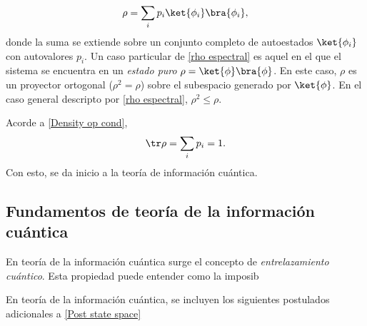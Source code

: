  \begin{equation}
     \rho = \sum_{i} p_i \ket{\phi_i} \bra{\phi_i},
     \label{rho espectral}
 \end{equation}
 donde la suma se extiende sobre un conjunto completo de autoestados $\ket{\phi_i}$ con autovalores $p_i$. Un caso particular de \eqref{rho espectral} es aquel en el que el sistema se encuentra en un \textit{estado puro} \ie      $\rho = \ket{\phi} \bra{\phi}$. En este caso, $\rho$ es un proyector ortogonal ($\rho^2 = \rho$) sobre el subespacio generado por $\ket{\phi}$. En el caso general descripto por \eqref{rho espectral}, $\rho^2 \leq \rho$.
 
 
 
 Acorde a \eqref{Density op cond}, 
 \begin{equation}
     \tr \rho = \sum_i p_i = 1.
 \end{equation}
 Con esto, se da inicio a la teoría de información cuántica.
 
 
 \subsection{Fundamentos de teoría de la información cuántica}
En teoría de la información cuántica surge el concepto de \textit{entrelazamiento cuántico}. Esta propiedad puede entender como la imposib 
 
En teoría de la información cuántica, se incluyen los siguientes postulados adicionales a \ref{Post state space}

